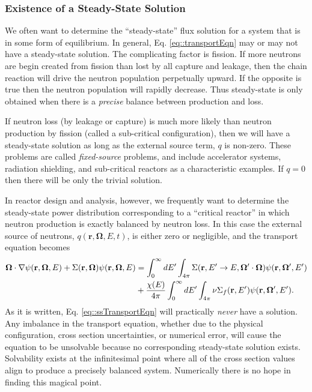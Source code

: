 \documentclass[11pt]{article}
\renewcommand\vec{\mathbf}
\begin{document}
\subsubsection{Existence of a Steady-State Solution}
\label{sec:orgheadline50}
We often want to determine the ``steady-state'' flux solution for a system that is in some form of equilibrium.  In general, Eq. \eqref{eq::transportEqn} may or may not have a steady-state solution.  The complicating factor is fission.  If more neutrons are begin created from fission than lost by all capture and leakage, then the chain reaction will drive the neutron population perpetually upward.  If the opposite is true then the neutron population will rapidly decrease.  Thus steady-state is only obtained when there is a \emph{precise} balance between production and loss.  

If neutron loss (by leakage or capture) is much more likely than neutron production by fission (called a sub-critical configuration), then we will have a steady-state solution as long as the external source term, \(q\) is non-zero.  These problems are called \emph{fixed-source} problems, and include accelerator systems, radiation shielding, and sub-critical reactors as a characteristic examples.  If \(q=0\) then there will be only the trivial solution.

In reactor design and analysis, however, we frequently want to determine the steady-state power distribution corresponding to a ``critical reactor'' in which neutron production is exactly balanced by neutron loss.  In this case the external source of neutrons, \(q(\vec{r},\vec{\Omega},E,t)\), is either zero or negligible, and the transport equation becomes
\begin{align}
  \vec{\Omega} \cdot \nabla\psi(\vec{r},\vec{\Omega},E)
  + \Sigma(\vec{r},\vec{\Omega}) \psi(\vec{r},\vec{\Omega},E)
  &= \int_0^\infty dE' \int_{4\pi} \Sigma(\vec{r},E' \rightarrow E, \vec{\Omega}'\cdot\vec{\Omega}) \psi(\vec{r},\vec{\Omega}',E') \notag\\
  &+ \frac{\chi(E)}{4\pi} \int_0^\infty dE' \int_{4\pi} \nu\Sigma_f(\vec{r},E') \psi(\vec{r},\vec{\Omega}',E').
  \label{eq::ssTransportEqn}
\end{align}
As it is written, Eq. \eqref{eq::ssTransportEqn} will practically \emph{never} have a solution.  Any imbalance in the transport equation, whether due to the physical configuration, cross section uncertainties, or numerical error, will cause the equation to be unsolvable because no corresponding steady-state solution exists.  Solvability exists at the infinitesimal point where all of the cross section values align to produce a precisely balanced system.  Numerically there is no hope in finding this magical point.
\end{document}
